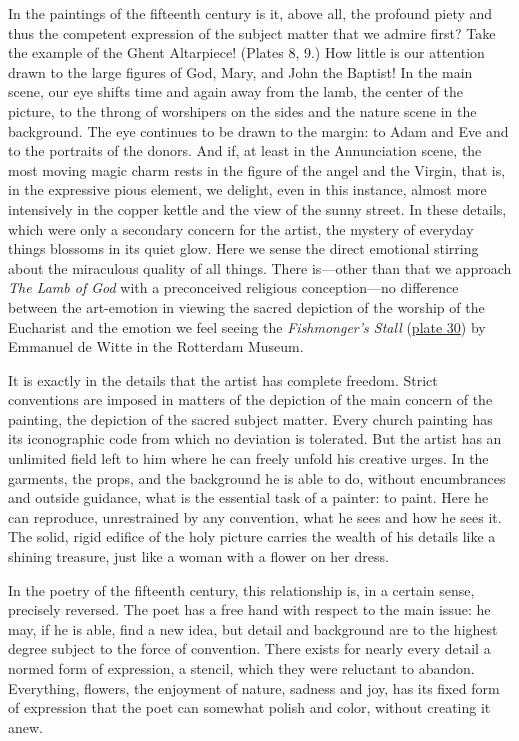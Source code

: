 In the paintings of the fifteenth century is it, above all, the profound
piety and thus the competent expression of the subject matter that we
admire first? Take the example of the Ghent Altarpiece! (Plates 8, 9.)
How little is our attention drawn to the large figures of God, Mary, and
John the Baptist! In the main scene, our eye shifts time and again away
from the lamb, the center of the picture, to the throng of worshipers on
the sides and the nature scene in the background. The eye continues to
be drawn to the margin: to Adam and Eve and to the portraits of the
donors. And if, at least in the Annunciation scene, the most moving
magic charm rests in the figure of the angel and the Virgin, that is, in
the expressive pious element, we delight, even in this instance, almost
more intensively in the copper kettle and the view of the sunny street.
In these details, which were only a secondary concern for the artist,
the mystery of everyday things blossoms in its quiet glow. Here we sense
the direct emotional stirring about the miraculous quality of all
things. There is---other than that we approach \emph{The Lamb of God}
with a preconceived religious conception---no difference between the
art-emotion in viewing the sacred depiction of the worship of
\protect\hypertarget{21_Chapter_Thirteen__IMAGE_AND_WORD.xhtmlux5cux23page_338}{}{}the
Eucharist and the emotion we feel seeing the \emph{Fishmonger's Stall}
(\protect\hyperlink{20_ILLUSTRATIONS_FOLLOW_PAGE.xhtmlux5cux23id_27}{plate
30}) by Emmanuel de Witte in the Rotterdam Museum.

It is exactly in the details that the artist has complete freedom.
Strict conventions are imposed in matters of the depiction of the main
concern of the painting, the depiction of the sacred subject matter.
Every church painting has its iconographic code from which no deviation
is tolerated. But the artist has an unlimited field left to him where he
can freely unfold his creative urges. In the garments, the props, and
the background he is able to do, without encumbrances and outside
guidance, what is the essential task of a painter: to paint. Here he can
reproduce, unrestrained by any convention, what he sees and how he sees
it. The solid, rigid edifice of the holy picture carries the wealth of
his details like a shining treasure, just like a woman with a flower on
her dress.

In the poetry of the fifteenth century, this relationship is, in a
certain sense, precisely reversed. The poet has a free hand with respect
to the main issue: he may, if he is able, find a new idea, but detail
and background are to the highest degree subject to the force of
convention. There exists for nearly every detail a normed form of
expression, a stencil, which they were reluctant to abandon. Everything,
flowers, the enjoyment of nature, sadness and joy, has its fixed form of
expression that the poet can somewhat polish and color, without creating
it anew.

